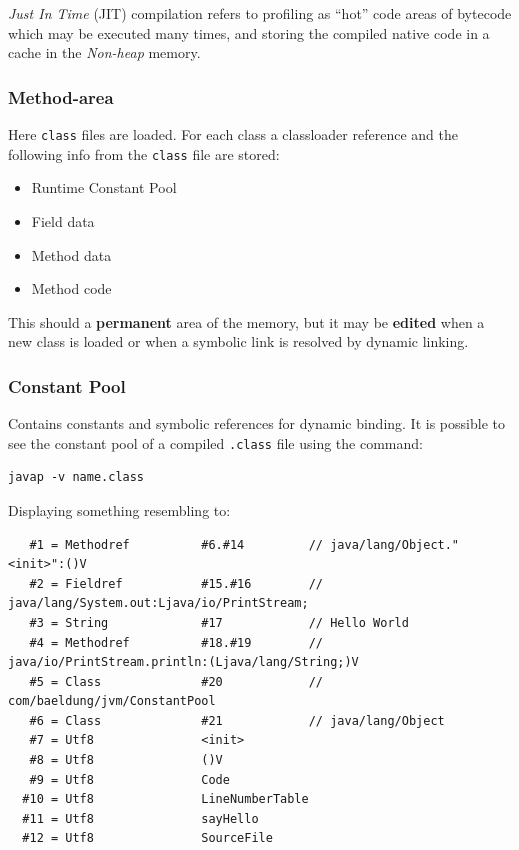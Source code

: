 \textit{Just In Time} (JIT) compilation refers to profiling as ``hot'' code areas of bytecode which may be executed many times, and storing the compiled native code in a cache in the \textit{Non-heap} memory.

\subsubsection{Method-area}
Here \lstinline{class} files are loaded.
For each class a classloader reference and the following info from the \lstinline{class} file are stored:
\begin{itemize}
    \item Runtime Constant Pool
    \item Field data
    \item Method data
    \item Method code
\end{itemize}


This should a \textbf{permanent} area of the memory, but it may be \textbf{edited} when a new class is loaded or when a symbolic link is resolved by dynamic linking.


\newpage
\subsubsection{Constant Pool}
Contains constants and symbolic references for dynamic binding.
It is possible to see the constant pool of a compiled \lstinline{.class} file using the command:
\begin{lstlisting}
javap -v name.class
\end{lstlisting}
Displaying something resembling to:
\begin{lstlisting}
   #1 = Methodref          #6.#14         // java/lang/Object."<init>":()V
   #2 = Fieldref           #15.#16        // java/lang/System.out:Ljava/io/PrintStream;
   #3 = String             #17            // Hello World
   #4 = Methodref          #18.#19        // java/io/PrintStream.println:(Ljava/lang/String;)V
   #5 = Class              #20            // com/baeldung/jvm/ConstantPool
   #6 = Class              #21            // java/lang/Object
   #7 = Utf8               <init>
   #8 = Utf8               ()V
   #9 = Utf8               Code
  #10 = Utf8               LineNumberTable
  #11 = Utf8               sayHello
  #12 = Utf8               SourceFile
\end{lstlisting}

